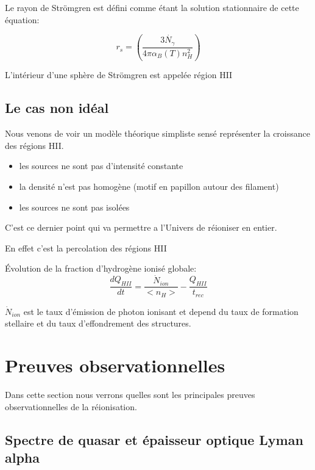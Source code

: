 %

Le rayon de Strömgren est défini comme étant la solution stationnaire de cette équation:

\begin{equation}
r_s = \left( \frac{3 \dot{N_\gamma} }{4 \pi \alpha_B(T) n_H^2} \right)
\end{equation}


L'intérieur d'une sphère de Strömgren est appelée région HII


\subsection{Le cas non idéal}
Nous venons de voir un modèle théorique simpliste sensé représenter la croissance des régions HII.

\begin{itemize}
\item les sources ne sont pas d'intensité constante
\item la densité n'est pas homogène (motif en papillon autour des filament)
\item les sources ne sont pas isolées
\end{itemize}

C'est ce dernier point qui va permettre a l'Univers de réioniser en entier.

En effet c'est la percolation des régions HII 


Évolution de la fraction d'hydrogène ionisé globale:
\begin{equation}
\frac{dQ_{HII}}{dt} = \frac{\dot{N}_{ion}}{ <n_H>} - \frac{Q_{HII}}{t_{rec}}
\end{equation}

$\dot{N}_{ion}$  est le taux d'émission de photon ionisant et depend du taux de formation stellaire et du taux d’effondrement des structures.

\section{Preuves observationnelles}
Dans cette section nous verrons quelles sont les principales preuves observationnelles de la réionisation.

\subsection{Spectre de quasar et épaisseur optique Lyman alpha}

